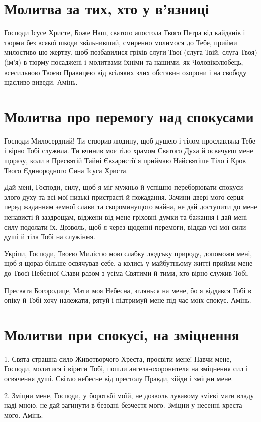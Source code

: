 \documentclass[chapters.tex]{subfiles}
\begin{document}
\section{Молитва за тих, хто у в’язниці}
Господи Ісусе Христе, Боже Наш, святого апостола Твого Петра від кайданів і тюрми без всякої шкоди звільнивший, смиренно молимося до Тебе, прийми милостиво цю жертву, щоб позбавилися гріхів слуги Твої (слуга Твій, слуга Твоя) (ім’я) в тюрму посаджені і молитвами їхніми та нашими, як Чоловіколюбець, всесильною Твоєю Правицею від всіляких злих обставин охорони і на свободу щасливо виведи. Амінь.

\section{Молитва про перемогу над спокусами}
Господи Милосердний! Ти створив людину, щоб душею і тілом прославляла Тебе і вірно Тобі служила. Ти вчинив моє тіло храмом Святого Духа й освячуєш мене щоразу, коли в Пресвятій Тайні Євхаристії я приймаю Найсвятіше Тіло і Кров Твого Єдинородного Сина Ісуса Христа.

Дай мені, Господи, силу, щоб я міг мужньо й успішно переборювати спокуси злого духу та всі мої низькі пристрасті й пожадання. Зачини двері мого серця перед жаданням земної слави та скороминущого майна, не дай доступити до мене ненависті й заздрощам, віджени від мене гріховні думки та бажання і дай мені силу подолати їх. Дозволь, щоб я через щоденні перемоги, віддав усі мої сили душі й тіла Тобі на служіння.

Укріпи, Господи, Твоєю Милістю мою слабку людську природу, допоможи мені, щоб я щораз більше освячував себе, а колись у майбутньому житті прийми мене до Твоєї Небесної Слави разом з усіма Святими й тими, хто вірно служив Тобі.

Пресвята Богородице, Мати моя Небесна, зглянься на мене, бо я віддався Тобі в опіку й Тобі хочу належати, рятуй і підтримуй мене під час моїх спокус. Амінь.

\section{Молитви при спокусі, на зміцнення}
1. Свята страшна сило Животворчого Хреста, просвіти мене! Навчи мене, Господи, молитися і вірити Тобі, пошли ангела-охоронителя на зміцнення сил і освячення душі. Світло небесне від престолу Правди, зійди і зміцни мене.

2. Зміцни мене, Господи, у боротьбі моїй, не дозволь лукавому змієві мати владу наді мною, не дай загинути в безодні безчестя мого. Зміцни у несенні хреста мого. Амінь.
\end{document}
